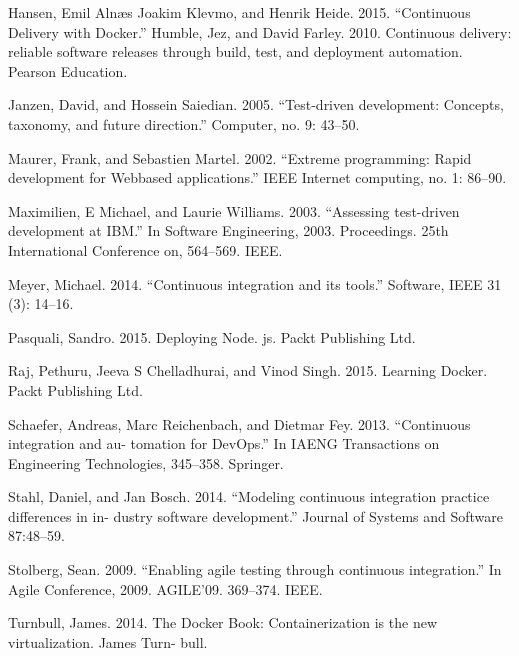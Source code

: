 Hansen, Emil Alnæs Joakim Klevmo, and Henrik Heide. 2015. “Continuous Delivery with Docker.” Humble, Jez, and David Farley. 2010. Continuous delivery: reliable software releases through build, test, and deployment automation. Pearson Education.

Janzen, David, and Hossein Saiedian. 2005. “Test-driven development: Concepts, taxonomy, and future direction.” Computer, no. 9: 43–50.

Maurer, Frank, and Sebastien Martel. 2002. “Extreme programming: Rapid development for Webbased applications.” IEEE Internet computing, no. 1: 86–90.

Maximilien, E Michael, and Laurie Williams. 2003. “Assessing test-driven development at IBM.” In Software Engineering, 2003. Proceedings. 25th International Conference on, 564–569. IEEE.

Meyer, Michael. 2014. “Continuous integration and its tools.” Software, IEEE 31 (3): 14–16.

Pasquali, Sandro. 2015. Deploying Node. js. Packt Publishing Ltd.

Raj, Pethuru, Jeeva S Chelladhurai, and Vinod Singh. 2015. Learning Docker. Packt Publishing Ltd.

Schaefer, Andreas, Marc Reichenbach, and Dietmar Fey. 2013. “Continuous integration and au- tomation for DevOps.” In IAENG Transactions on Engineering Technologies, 345–358. Springer.

Stahl, Daniel, and Jan Bosch. 2014. “Modeling continuous integration practice differences in in- dustry software development.” Journal of Systems and Software 87:48–59.

Stolberg, Sean. 2009. “Enabling agile testing through continuous integration.” In Agile Conference, 2009. AGILE’09. 369–374. IEEE.

Turnbull, James. 2014. The Docker Book: Containerization is the new virtualization. James Turn- bull.

\newpage
